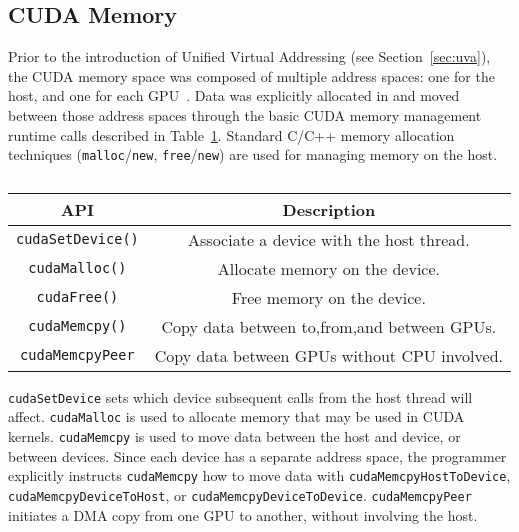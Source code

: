 \subsection{CUDA Memory}

Prior to the introduction of Unified Virtual Addressing (see Section~\ref{sec:uva}), the CUDA memory space was composed of multiple address spaces: one for the host, and one for each GPU~\cite{schroeder2011peer}.
Data was explicitly allocated in and moved between those address spaces through the basic CUDA memory management runtime calls described in Table~\ref{tab:cuda-basic-apis}.
Standard C/C++ memory allocation techniques (\texttt{malloc}/\texttt{new}, \texttt{free}/\texttt{new}) are used for managing memory on the host.

\begin{table}[h]
	\centering
	\caption[Basic CUDA Memory-management APIs]{}
	\label{tab:cuda-basic-apis}
	\begin{tabular}{|c|c|}
		\hline
		\textbf{API}             & \textbf{Description}                        \\ \hline
		\texttt{cudaSetDevice()} & Associate a device with the host thread.    \\ \hline
		\texttt{cudaMalloc()}    & Allocate memory on the device.              \\ \hline
		\texttt{cudaFree()}      & Free memory on the device.                  \\ \hline
		\texttt{cudaMemcpy()}    & Copy data between to,from,and between GPUs. \\ \hline
		\texttt{cudaMemcpyPeer}  & Copy data between GPUs without CPU involved. \\ \hline 
	\end{tabular}
\end{table}

\texttt{cudaSetDevice} sets which device subsequent calls from the host thread will affect.
\texttt{cudaMalloc} is used to allocate memory that may be used in CUDA kernels.
\texttt{cudaMemcpy} is used to move data between the host and device, or between devices.
Since each device has a separate address space, the programmer explicitly instructs \texttt{cudaMemcpy} how to move data with \texttt{cudaMemcpyHostToDevice}, \texttt{cudaMemcpyDeviceToHost}, or \texttt{cudaMemcpyDeviceToDevice}.
\texttt{cudaMemcpyPeer} initiates a DMA copy from one GPU to another, without involving the host.

